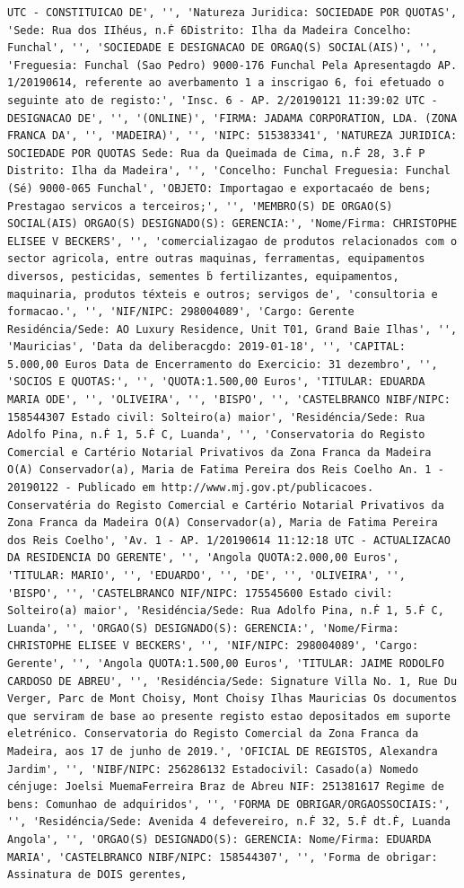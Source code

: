\documentclass[
  12pt,
]{article}
\begin{document}
\begin{verbatim}
UTC - CONSTITUICAO DE', '', 'Natureza Juridica: SOCIEDADE POR QUOTAS', 'Sede: Rua dos IIhéus, n.Ḟ 6Distrito: Ilha da Madeira Concelho: Funchal', '', 'SOCIEDADE E DESIGNACAO DE ORGAQ(S) SOCIAL(AIS)', '', 'Freguesia: Funchal (Sao Pedro) 9000-176 Funchal Pela Apresentagdo AP. 1/20190614, referente ao averbamento 1 a inscrigao 6, foi efetuado o seguinte ato de registo:', 'Insc. 6 - AP. 2/20190121 11:39:02 UTC - DESIGNACAO DE', '', '(ONLINE)', 'FIRMA: JADAMA CORPORATION, LDA. (ZONA FRANCA DA', '', 'MADEIRA)', '', 'NIPC: 515383341', 'NATUREZA JURIDICA: SOCIEDADE POR QUOTAS Sede: Rua da Queimada de Cima, n.Ḟ 28, 3.Ḟ P Distrito: Ilha da Madeira', '', 'Concelho: Funchal Freguesia: Funchal (Sé) 9000-065 Funchal', 'OBJETO: Importagao e exportacaéo de bens; Prestagao servicos a terceiros;', '', 'MEMBRO(S) DE ORGAO(S) SOCIAL(AIS) ORGAO(S) DESIGNADO(S): GERENCIA:', 'Nome/Firma: CHRISTOPHE ELISEE V BECKERS', '', 'comercializagao de produtos relacionados com o sector agricola, entre outras maquinas, ferramentas, equipamentos diversos, pesticidas, sementes ḃ fertilizantes, equipamentos, maquinaria, produtos téxteis e outros; servigos de', 'consultoria e formacao.', '', 'NIF/NIPC: 298004089', 'Cargo: Gerente Residéncia/Sede: AO Luxury Residence, Unit T01, Grand Baie Ilhas', '', 'Mauricias', 'Data da deliberacgdo: 2019-01-18', '', 'CAPITAL: 5.000,00 Euros Data de Encerramento do Exercicio: 31 dezembro', '', 'SOCIOS E QUOTAS:', '', 'QUOTA:1.500,00 Euros', 'TITULAR: EDUARDA MARIA ODE', '', 'OLIVEIRA', '', 'BISPO', '', 'CASTELBRANCO NIBF/NIPC: 158544307 Estado civil: Solteiro(a) maior', 'Residéncia/Sede: Rua Adolfo Pina, n.Ḟ 1, 5.Ḟ C, Luanda', '', 'Conservatoria do Registo Comercial e Cartério Notarial Privativos da Zona Franca da Madeira O(A) Conservador(a), Maria de Fatima Pereira dos Reis Coelho An. 1 - 20190122 - Publicado em http://www.mj.gov.pt/publicacoes. Conservatéria do Registo Comercial e Cartério Notarial Privativos da Zona Franca da Madeira O(A) Conservador(a), Maria de Fatima Pereira dos Reis Coelho', 'Av. 1 - AP. 1/20190614 11:12:18 UTC - ACTUALIZACAO DA RESIDENCIA DO GERENTE', '', 'Angola QUOTA:2.000,00 Euros', 'TITULAR: MARIO', '', 'EDUARDO', '', 'DE', '', 'OLIVEIRA', '', 'BISPO', '', 'CASTELBRANCO NIF/NIPC: 175545600 Estado civil: Solteiro(a) maior', 'Residéncia/Sede: Rua Adolfo Pina, n.Ḟ 1, 5.Ḟ C, Luanda', '', 'ORGAO(S) DESIGNADO(S): GERENCIA:', 'Nome/Firma: CHRISTOPHE ELISEE V BECKERS', '', 'NIF/NIPC: 298004089', 'Cargo: Gerente', '', 'Angola QUOTA:1.500,00 Euros', 'TITULAR: JAIME RODOLFO CARDOSO DE ABREU', '', 'Residéncia/Sede: Signature Villa No. 1, Rue Du Verger, Parc de Mont Choisy, Mont Choisy Ilhas Mauricias Os documentos que serviram de base ao presente registo estao depositados em suporte eletrénico. Conservatoria do Registo Comercial da Zona Franca da Madeira, aos 17 de junho de 2019.', 'OFICIAL DE REGISTOS, Alexandra Jardim', '', 'NIBF/NIPC: 256286132 Estadocivil: Casado(a) Nomedo cénjuge: Joelsi MuemaFerreira Braz de Abreu NIF: 251381617 Regime de bens: Comunhao de adquiridos', '', 'FORMA DE OBRIGAR/ORGAOSSOCIAIS:', '', 'Residéncia/Sede: Avenida 4 defevereiro, n.Ḟ 32, 5.Ḟ dt.Ḟ, Luanda Angola', '', 'ORGAO(S) DESIGNADO(S): GERENCIA: Nome/Firma: EDUARDA MARIA', 'CASTELBRANCO NIBF/NIPC: 158544307', '', 'Forma de obrigar: Assinatura de DOIS gerentes, 
\end{verbatim}
\end{document}
